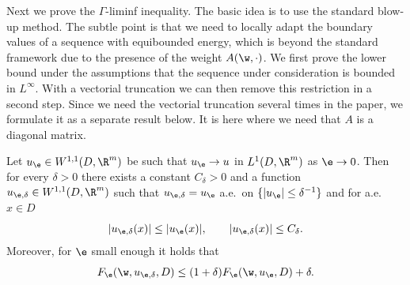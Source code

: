 Next we prove the $\Gamma$-liminf inequality. The basic idea is to use the standard blow-up method. The subtle point is that we need to locally adapt the boundary values of a sequence with equibounded energy, which is beyond the standard framework due to the presence of the weight $A(\w,\cdot)$. We first prove the lower bound under the assumptions that the sequence under consideration is bounded in $L^{\infty}$. With a vectorial truncation we can then remove this restriction in a second step. Since we need the vectorial truncation several times in the paper, we formulate it as a separate result below. It is here where we need that $A$ is a diagonal matrix.
\begin{lemma}\label{l.truncation}
Let $u_{\e}\in W^{1,1}(D,\R^m)$ be such that $u_{\e}\to u$ in $L^1(D,\R^m)$ as $\e\to\nobreak 0$. Then for every $\delta>0$ there exists a constant $C_{\delta}>0$ and a function $u_{\e,\delta}\in W^{1,1}(D,\R^m)$ such that $u_{\e,\delta}=u_{\e}$ a.e.\ on $\{|u_{\e}|\leq \delta^{-1}\}$ and for a.e.\ $x\in D$
\begin{equation*}
|u_{\e,\delta}(x)|\leq |u_{\e}(x)|,\quad\quad |u_{\e,\delta}(x)|\leq C_{\delta}.
\end{equation*}
Moreover, for $\e$ small enough it holds that
\begin{equation*}
F_{\e}(\w,u_{\e,\delta},D)\leq (1+\delta)F_{\e}(\w,u_{\e},D)+\delta.
\end{equation*}
\end{lemma}
